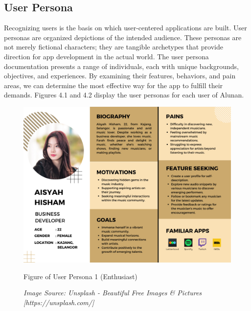 \subsection{User Persona}
Recognizing users is the basis on which user-centered applications are built. User personas are organized depictions of the intended audience. These personas are not merely fictional characters; they are tangible archetypes that provide direction for app development in the actual world. The user persona documentation presents a range of individuals, each with unique backgrounds, objectives, and experiences. By examining their features, behaviors, and pain areas, we can determine the most effective way for the app to fulfill their demands. Figures 4.1 and 4.2 display the user personas for each user of Alunan. \\

\begin{figure}[h]
    \centering
    \includegraphics[width=0.9\linewidth]{mainmatter/images/userpersona1.png}
	\caption{Figure of User Persona 1 (Enthusiast)}
    \caption*{\textit{Image Source: Unsplash - Beautiful Free Images \& Pictures [https://unsplash.com/]}}
    \label{fig:myfig40}
\end{figure}


